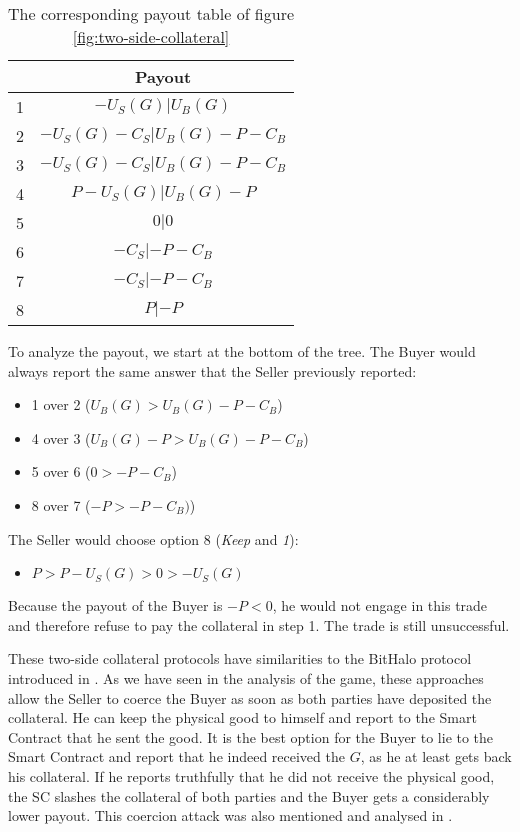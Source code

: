 \documentclass{cacthesis}
\begin{document}
\begin{table}[htb!]
    \centering
    \begin{tabular}{ |c|c| }
    \hline
    & Payout  \\
    \hline
    \hline
    1& $-U_S(G) | U_B(G)$\\
    \hline
    2& $-U_S(G) - C_S| U_B(G)- P - C_B $\\
    \hline
    3&$-U_S(G) - C_S | U_B(G) -P - C_B$ \\
    \hline
    4& $P-U_S(G)| U_B(G)-P$\\
    \hline
    5& $0|0$\\
    \hline 
    6& $-C_S |-P - C_B$\\
    \hline
    7& $-C_S| -P-C_B$\\
    \hline
    8& $P| -P$\\
    \hline
    \end{tabular}
    \caption{The corresponding payout table of figure \ref{fig:two-side-collateral}}
\end{table}

To analyze the payout, we start at the bottom of the tree. The Buyer would always report the same answer that the Seller previously reported:
\begin{itemize}
    \item 1 over 2 ($U_B(G) > U_B(G) -P -C_B$)
    \item 4 over 3 ($U_B(G) - P > U_B(G) -P -C_B$)
    \item 5 over 6 ($0 > -P -C_B$)
    \item 8 over 7 ($-P > -P -C_B)$)
\end{itemize}
The Seller would choose option 8 (\emph{Keep} and \emph{1}):
\begin{itemize}
    \item $P>P-U_S(G)>0>-U_S(G)$
\end{itemize}
Because the payout of the Buyer is $-P<0$, he would not engage in this trade and therefore refuse to pay the collateral in step 1. The trade is still unsuccessful.\newline

These two-side collateral protocols have similarities to the BitHalo protocol introduced in \cite{zimbeck_two_nodate}. As we have seen in the analysis of the game, these approaches allow the Seller to coerce the Buyer as soon as both parties have deposited the collateral. He can keep the physical good to himself and report to the Smart Contract that he sent the good. It is the best option for the Buyer to lie to the Smart Contract and report that he indeed received the $G$, as he at least gets back his collateral. If he reports truthfully that he did not receive the physical good, the SC slashes the collateral of both parties and the Buyer gets a considerably lower payout. This coercion attack was also mentioned and analysed in \cite{goharshady_irrationality_2021}.
\end{document}
